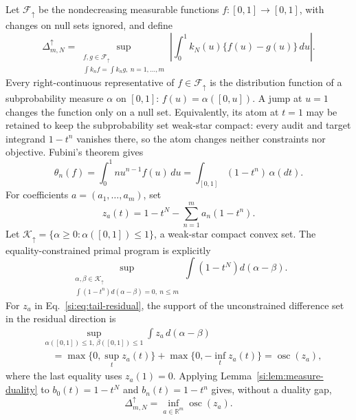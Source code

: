 \documentclass[10pt,twocolumn]{article}
\newcommand{\cF}{\mathcal F}
\begin{document}
Let $\cF_\uparrow$ be the nondecreasing measurable functions $f:[0,1]\to[0,1]$, with changes on null sets ignored, and define
\begin{equation}
\Delta^\uparrow_{m,N}
=\sup_{\substack{f,g\in\cF_\uparrow\\
\int k_nf=\int k_ng,\ n=1,\ldots,m}}
\left|\int_0^1 k_N(u)\{f(u)-g(u)\}\,du\right|.
\label{si:eq:monotone-ambiguity}
\end{equation}
Every right-continuous representative of $f\in\cF_\uparrow$ is the distribution function of a subprobability measure $\alpha$ on $[0,1]$: $f(u)=\alpha([0,u])$. A jump at $u=1$ changes the function only on a null set. Equivalently, its atom at $t=1$ may be retained to keep the subprobability set weak-star compact: every audit and target integrand $1-t^n$ vanishes there, so the atom changes neither constraints nor objective. Fubini's theorem gives
\begin{equation}
\theta_n(f)
=\int_0^1nu^{n-1}f(u)\,du
=\int_{[0,1]}(1-t^n)\,\alpha(dt).
\label{si:eq:cdf-tail-moments}
\end{equation}
For coefficients $a=(a_1,\ldots,a_m)$, set
\begin{equation}
z_a(t)=1-t^N-\sum_{n=1}^ma_n(1-t^n).
\label{si:eq:tail-residual}
\end{equation}
Let $\mathcal K_\uparrow=\{\alpha\ge0:\alpha([0,1])\le1\}$, a weak-star compact
convex set. The equality-constrained primal program is explicitly
\begin{equation}
\sup_{\substack{\alpha,\beta\in\mathcal K_\uparrow\\
\int(1-t^n)d(\alpha-\beta)=0,\ n\le m}}
\int(1-t^N)d(\alpha-\beta).
\label{si:eq:monotone-measure-primal}
\end{equation}
For $z_a$ in Eq.~\ref{si:eq:tail-residual}, the support of the unconstrained
difference set in the residual direction is
\begin{align}
&\sup_{\alpha([0,1])\le1,\,\beta([0,1])\le1}
\int z_a\,d(\alpha-\beta)\nonumber\\
&\quad=\max\{0,\sup_tz_a(t)\}+\max\{0,-\inf_tz_a(t)\}
=\operatorname{osc}(z_a),
\label{si:eq:osc-support}
\end{align}
where the last equality uses $z_a(1)=0$. Applying
Lemma~\ref{si:lem:measure-duality} to
$b_0(t)=1-t^N$ and $b_n(t)=1-t^n$ gives, without a duality gap,
\begin{equation}
\Delta^\uparrow_{m,N}=\inf_{a\in\mathbb R^m}\operatorname{osc}(z_a).
\label{si:eq:monotone-osc-dual}
\end{equation}
\end{document}
